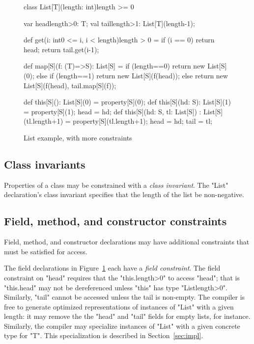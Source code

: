 \begin{figure}
{\footnotesize
\begin{xtennoindent}
class List[T](length: int){length >= 0} {
  var head{length>0}: T;
  val tail{length>1}: List[T](length-1);

  def get(i: int{0 <= i, i < length}){length > 0} = {
    if (i == 0) return head;
    return tail.get(i-1);
  }

  def map[S](f: (T)=>S): List[S] = {
    if (length==0)
      return new List[S](0);
    else if (length==1)
      return new List[S](f(head));
    else
      return new List[S](f(head), tail.map[S](f));
  }

  def this[S](): List[S](0) = property[S](0);
  def this[S](hd: S): List[S](1) = {
    property[S](1); head = hd;
  }
  def this[S](hd: S, tl: List[S]) : List[S](tl.length+1) = {
    property[S](tl.length+1);
    head = hd; tail = tl;
  }
}
\end{xtennoindent}}
\caption{List example, with more constraints}
\label{fig:list}
\end{figure}

\subsection{Class invariants}

Properties of a class may be constrained with 
a \emph{class invariant}.   
The \xcd"List" declaration's class invariant specifies that the length of
the list be non-negative.

\subsection{Field, method, and constructor constraints}

Field, method, and constructor declarations may have additional
constraints that must be satisfied for access.

The field  declarations in Figure~\ref{fig:list}
each have a \emph{field constraint}.  The field constraint on
\xcd"head" requires that the \xcd"this.length>0" to access
\xcd"head"; that is \xcd"this.head" may not be dereferenced
unless \xcd"this" has type \xcd"List{length>0}".  Similarly,
\xcd"tail" cannot be accessed unless the tail is non-empty.  The
compiler is free to generate optimized representations of
instances of \xcd"List" with a given length: it may remove the
the \xcd"head" and \xcd"tail" fields for empty lists, for
instance.  Similarly, the compiler may specialize instances of
\xcd"List" with a given concrete type for \xcd"T".  This
specialization is described in Section~\ref{sec:impl}.

